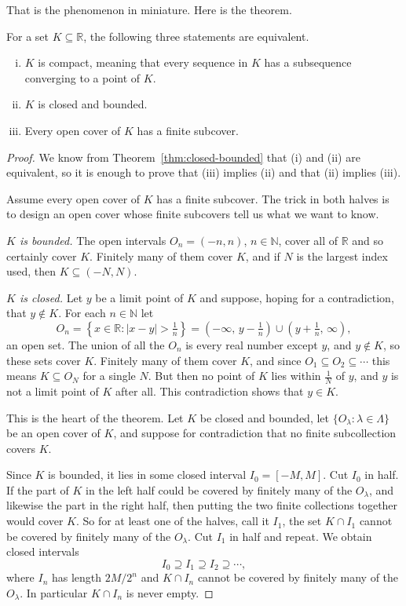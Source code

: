 That is the phenomenon in miniature.  Here is the theorem.

\begin{theorem}\label{thm:heine-borel}
For a set $K \subseteq \mathbb{R}$, the following three statements are equivalent.
\begin{enumerate}[(i)]
	\item $K$ is compact, meaning that every sequence in $K$ has a subsequence converging to a point of $K$.
	\item $K$ is closed and bounded.
	\item Every open cover of $K$ has a finite subcover.
\end{enumerate}
\end{theorem}

\begin{proof}
We know from Theorem~\ref{thm:closed-bounded} that (i) and (ii) are equivalent, so it is enough to prove that (iii) implies (ii) and that (ii) implies (iii).

  Assume every open cover of $K$ has a finite subcover.  The trick in both halves is to design an open cover whose finite subcovers tell us what we want to know.

\emph{$K$ is bounded.}  The open intervals $O_n = (-n, n)$, $n \in \mathbb{N}$, cover all of $\mathbb{R}$ and so certainly cover $K$.  Finitely many of them cover $K$, and if $N$ is the largest index used, then $K \subseteq (-N, N)$.

\emph{$K$ is closed.}  Let $y$ be a limit point of $K$ and suppose, hoping for a contradiction, that $y \notin K$.  For each $n \in \mathbb{N}$ let
\[ O_n = \left\{x \in \mathbb{R} : |x - y| > \tfrac1n\right\} = \left(-\infty,\, y - \tfrac1n\right) \cup \left(y + \tfrac1n,\, \infty\right), \]
an open set.  The union of all the $O_n$ is every real number except $y$, and $y \notin K$, so these sets cover $K$.  Finitely many of them cover $K$, and since $O_1 \subseteq O_2 \subseteq \cdots$ this means $K \subseteq O_N$ for a single $N$.  But then no point of $K$ lies within $\frac1N$ of $y$, and $y$ is not a limit point of $K$ after all.  This contradiction shows that $y \in K$.

  This is the heart of the theorem.  Let $K$ be closed and bounded, let $\{O_{\lambda} : \lambda \in \Lambda\}$ be an open cover of $K$, and suppose for contradiction that no finite subcollection covers $K$.

Since $K$ is bounded, it lies in some closed interval $I_0 = [-M, M]$.  Cut $I_0$ in half.  If the part of $K$ in the left half could be covered by finitely many of the $O_{\lambda}$, and likewise the part in the right half, then putting the two finite collections together would cover $K$.  So for at least one of the halves, call it $I_1$, the set $K \cap I_1$ cannot be covered by finitely many of the $O_{\lambda}$.  Cut $I_1$ in half and repeat.  We obtain closed intervals
\[ I_0 \supseteq I_1 \supseteq I_2 \supseteq \cdots, \]
where $I_n$ has length $2M/2^n$ and $K \cap I_n$ cannot be covered by finitely many of the $O_{\lambda}$.  In particular $K \cap I_n$ is never empty.


\end{proof}
